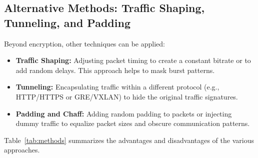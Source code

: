 \documentclass{article}
\begin{document}
\subsection{Alternative Methods: Traffic Shaping, Tunneling, and Padding}
Beyond encryption, other techniques can be applied:
\begin{itemize}[noitemsep]
    \item \textbf{Traffic Shaping:} Adjusting packet timing to create a constant bitrate or to add random delays. This approach helps to mask burst patterns.
    \item \textbf{Tunneling:} Encapsulating traffic within a different protocol (e.g., HTTP/HTTPS or GRE/VXLAN) to hide the original traffic signatures.
    \item \textbf{Padding and Chaff:} Adding random padding to packets or injecting dummy traffic to equalize packet sizes and obscure communication patterns.
\end{itemize}

Table~\ref{tab:methods} summarizes the advantages and disadvantages of the various approaches.
\end{document}
